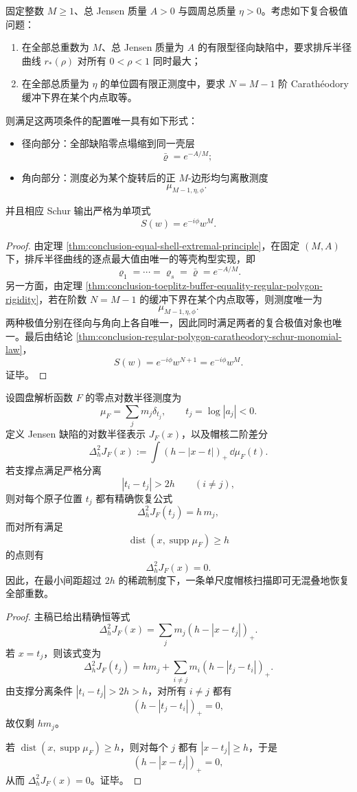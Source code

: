 \begin{theorem}\label{thm:conclusion-radial-angular-synchronous-extremal-rigidity}
固定整数 \(M\ge 1\)、总 Jensen 质量 \(A>0\) 与圆周总质量 \(\eta>0\)。考虑如下复合极值问题：
\begin{enumerate}
  \item 在全部总重数为 \(M\)、总 Jensen 质量为 \(A\) 的有限型径向缺陷中，要求排斥半径曲线 \(r_*(\rho)\) 对所有 \(0<\rho<1\) 同时最大；
  \item 在全部总质量为 \(\eta\) 的单位圆有限正测度中，要求 \(N=M-1\) 阶 Carath\'eodory 缓冲下界在某个内点取等。
\end{enumerate}
则满足这两项条件的配置唯一具有如下形式：
\begin{itemize}
  \item 径向部分：全部缺陷零点塌缩到同一壳层
  \[
  \bar\varrho=e^{-A/M};
  \]
  \item 角向部分：测度必为某个旋转后的正 \(M\)-边形均匀离散测度
  \[
  \mu_{M-1,\eta,\phi}.
  \]
\end{itemize}
并且相应 Schur 输出严格为单项式
\[
S(w)=e^{-i\phi}w^{M}.
\]
\end{theorem}
\begin{proof}
由定理 \ref{thm:conclusion-equal-shell-extremal-principle}，在固定 \((M,A)\) 下，排斥半径曲线的逐点最大值由唯一的等壳构型实现，即
\[
\varrho_1=\cdots=\varrho_s=\bar\varrho=e^{-A/M}.
\]
另一方面，由定理 \ref{thm:conclusion-toeplitz-buffer-equality-regular-polygon-rigidity}，若在阶数 \(N=M-1\) 的缓冲下界在某个内点取等，则测度唯一为
\[
\mu_{M-1,\eta,\phi}.
\]
两种极值分别在径向与角向上各自唯一，因此同时满足两者的复合极值对象也唯一。最后由结论 \ref{thm:conclusion-regular-polygon-caratheodory-schur-monomial-law}，
\[
S(w)=e^{-i\phi}w^{N+1}=e^{-i\phi}w^M.
\]
证毕。
\end{proof}

\begin{theorem}[稀疏零点半径谱的一尺度精确反演]\label{thm:conclusion-jensen-defect-single-scale-sparse-radius-inversion}
设圆盘解析函数 \(F\) 的零点对数半径测度为
\[
\mu_F=\sum_j m_j\delta_{t_j},
\qquad
t_j=\log|a_j|<0.
\]
定义 Jensen 缺陷的对数半径表示 \(J_F(x)\)，以及帽核二阶差分
\[
\Delta_h^2 J_F(x):=\int (h-|x-t|)_+\,\dd\mu_F(t).
\]
若支撑点满足严格分离
\[
|t_i-t_j|>2h
\qquad(i\neq j),
\]
则对每个原子位置 \(t_j\) 都有精确恢复公式
\[
\Delta_h^2 J_F(t_j)=h\,m_j,
\]
而对所有满足
\[
\operatorname{dist}(x,\operatorname{supp}\mu_F)\ge h
\]
的点则有
\[
\Delta_h^2 J_F(x)=0.
\]
因此，在最小间距超过 \(2h\) 的稀疏制度下，一条单尺度帽核扫描即可无混叠地恢复全部重数。
\end{theorem}
\begin{proof}
主稿已给出精确恒等式
\[
\Delta_h^2J_F(x)=\sum_j m_j(h-|x-t_j|)_+.
\]
若 \(x=t_j\)，则该式变为
\[
\Delta_h^2J_F(t_j)=hm_j+\sum_{i\neq j}m_i(h-|t_j-t_i|)_+.
\]
由支撑分离条件 \(|t_i-t_j|>2h>h\)，对所有 \(i\neq j\) 都有
\[
(h-|t_j-t_i|)_+=0,
\]
故仅剩 \(hm_j\)。

若 \(\operatorname{dist}(x,\operatorname{supp}\mu_F)\ge h\)，则对每个 \(j\) 都有 \(|x-t_j|\ge h\)，于是
\[
(h-|x-t_j|)_+=0,
\]
从而 \(\Delta_h^2J_F(x)=0\)。证毕。
\end{proof}

